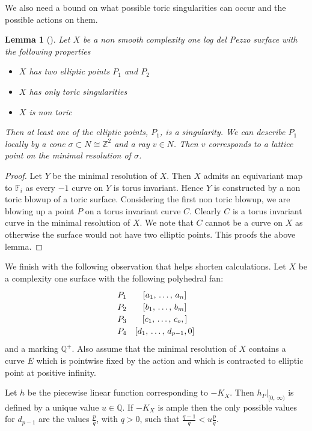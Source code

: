 \documentclass[11pt]{amsart}
\theoremstyle{plain}
\newtheorem{lem}[thm]{Lemma}
\newcommand{\mb}[1]{\mathbb{#1}}
\begin{document}
We also need a bound on what possible toric singularities can occur and the possible actions on them.

\begin{lem}[\label{Structure}]
Let $X$ be a non smooth complexity one log del Pezzo surface with the following properties 
\begin{itemize}
\item $X$ has two elliptic points $P_1$ and $P_2$
\item $X$ has only toric singularities
\item $X$ is non toric
\end{itemize}

Then at least one of the elliptic points, $P_1$, is a singularity.  We can describe $P_1$ locally by a cone $\sigma \subset N \cong \mb{Z}^2$ and a ray $v \in N$. Then $v$ corresponds to a lattice point on the minimal resolution of $\sigma$.
\end{lem}

\begin{proof}
Let $Y$ be the minimal resolution of $X$. Then $X$ admits an equivariant map to $\mb{F}_i$ as every $-1$ curve on $Y$ is torus invariant. Hence $Y$ is constructed by a non toric blowup of a toric surface. Considering the first non toric blowup, we are blowing up a point $P$ on a torus invariant curve $C$. Clearly $C$ is a torus invariant curve in the minimal resolution of $X$. We note that $C$ cannot be a curve on $X$ as otherwise the surface would not have two elliptic points. This proofs the above lemma.


\end{proof}

We finish with the following observation that helps shorten calculations.
Let $X$ be a complexity one surface with the following polyhedral fan:
\[\def\arraystretch{1.2}
\begin{array}{cc}
P_1 & \left[ a_1, \, \dots , \, a_n \right] \\ 
P_2 & \left[b_1 , \, \dots, \, b_m \right] \\
P_3 & \left[c_1, \, \dots, \, c_o, \right] \\
P_4 & \left[d_1, \, \dots, \, d_{p-1}, 0\right]  \\
\end{array}
\]
and a marking $\mb{Q}^+$.
Also assume that the minimal resolution of $X$ contains a curve $E$ which is pointwise fixed by the action and which is contracted to elliptic point at positive infinity.

Let $h$ be the piecewise linear function corresponding to $-K_X$. Then $h_P|_{[0, \, \infty)}$ is defined by a unique value $u \in \mb{Q}$. If $-K_X$ is ample then the only possible values for $d_{p-1}$ are the values $\frac{p}{q}$, with $q >0$, such that $\frac{q-1}{q} < u\frac{p}{q}$. 
\end{document}
